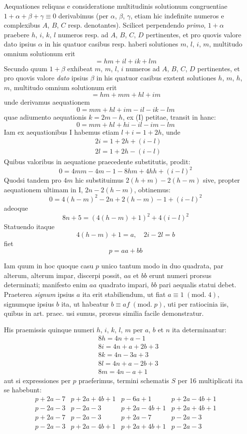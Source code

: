 \documentclass[twoside,12pt, showframe]{memoir}
\renewcommand{\pmod}[1]{\;(\textrm{mod.}\;#1)}
\begin{document}
Aequationes reliquas e consideratione multitudinis solutionum congruentiae \(1+\alpha+\beta+\gamma \equiv 0\) derivabimus (per \(\alpha\), \(\beta\), \(\gamma\), etiam hic indefinite numeros e complexibus \(A\), \(B\), \(C\) resp. denotantes). Scilicet perpendendo \textit{primo}, \(1+\alpha\) praebere \(h\), \(i\), \(k\), \(l\) numeros resp. ad \(A\), \(B\), \(C\), \(D\) pertinentes, et pro quovis valore dato ipsius \(\alpha\) in his quatuor casibus resp. haberi solutiones \(m\), \(l\), \(i\), \(m\), multitudo omnium solutionum erit
\[=h m+i l+i k+l m\]
Secundo quum \(1+\beta\) exhibeat \(m\), \(m\), \(l\), \(i\) numeros ad \(A\), \(B\), \(C\), \(D\) pertinentes, et pro quovis valore \textit{dato} ipsius \(\beta\) in his quatuor casibus exstent solutiones \(h\), \(m\), \(h\), \(m\), multitudo omnium solutionum erit
\[=h m+m m+h l+i m\]
unde derivamus aequationem
\[0=m m+h l+i m-i l-i k-l m\]
quae adiumento aequationis \(k=2 m-h\), ex (I) petitae, transit in hanc:
\[0=m m+h l+h i-i l-i m-l m\]
Iam ex aequationibus I habemus etiam \(l+i=1+2 h\), unde
\[\begin{aligned}
& 2 i=1+2 h+(i-l) \\
& 2 l=1+2 h-(i-l)
\end{aligned}\]\clearpage\noindent%
Quibus valoribus in aequatione praecedente substitutis, prodit:
\[0=4 m m-4 m-1-8 h m+4 h h+(i-l)^{2}\]
Quodsi tandem pro \(4 m\) hic substituimus \(2(h+m)-2(h-m)\) sive, propter aequationem ultimam in I, \(2 n-2(h-m)\), obtinemus:
\[0=4(h-m)^{2}-2 n+2(h-m)-1+(i-l)^{2}\]
adeoque
\[8 n+5=(4(h-m)+1)^{2}+4(i-l)^{2}\]
Statuendo itaque
\[4(h-m)+1=a, \quad 2 i-2 l=b\]
fiet
\[p=a a+b b\]

Iam quum in hoc quoque casu \(p\) unico tantum modo in duo quadrata, par alterum, alterum impar, discerpi possit, \(a a\) et \(b b\) erunt numeri prorsus determinati; manifesto enim \(a a\) quadrato impari, \(b b\) pari aequalis statui debet. Praeterea \textit{signum} ipsius \(a\) ita erit stabiliendum, ut fiat \(a \equiv 1\pmod{4}\), signumque ipsius \(b\) ita, ut habeatur \(b \equiv a f\pmod{p}\), uti per ratiocinia iis, quibus in art. praec. usi sumus, prorsus similia facile demonstratur.

His praemissis quinque numeri \(h\), \(i\), \(k\), \(l\), \(m\) per \(a\), \(b\) et \(n\) ita determinantur:
\[\begin{aligned}
& 8 h=4 n+a-1 \\
& 8 i=4 n+a+2 b+3 \\
& 8 k=4 n-3 a+3 \\
& 8 l=4 n+a-2 b+3 \\
& 8 m=4 n-a+1
\end{aligned}\]
aut si expressiones per \(p\) praeferimus, termini schematis \(S\) per 16 multiplicati ita se habebunt:
\[\begin{array}{l|l|l|l}
p+2 a-7 & p+2 a+4 b+1 & p-6 a+1 & p+2 a-4 b+1 \\
p-2 a-3 & p-2 a-3 & p+2 a-4 b+1 & p+2 a+4 b+1 \\
p+2 a-7 & p-2 a-3 & p+2 a-7 & p-2 a-3 \\
p-2 a-3 & p+2 a-4 b+1 & p+2 a+4 b+1 & p-2 a-3
\end{array}\]\clearpage\noindent%
\end{document}
